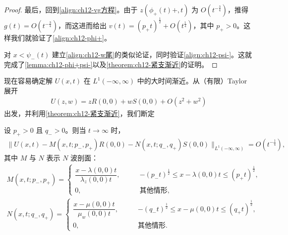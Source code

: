 \documentclass[../../main.tex]{subfiles}
\begin{document}
\begin{proof}
最后，回到\eqref{align:ch12-vg方程}。由于 $z(\phi_+(t)+,t)$ 为 $O(t^{-\frac34})$，推得 $g(t)=O(t^{-\frac34})$，而这进而给出 $v(t)=(p_+t)^{\frac12}+O(t^{\frac14})$，其中 $p_+>0$。这样我们就验证了\eqref{align:ch12-phi+}。

对 $x<\psi_-(t)$ 建立\eqref{align:ch12-w尾}的类似论证，同时验证\eqref{align:ch12-psi-}。这就完成了\cref{lemma:ch12-phi+psi-}以及\cref{theorem:ch12-紧支渐近}的证明。
\end{proof}

现在容易确定解 $U(x,t)$ 在 $L^1(-\infty,\infty)$ 中的大时间渐近。从（有限）Taylor 展开
\begin{align}
U(z,w)=zR(0,0)+wS(0,0)+O(z^2+w^2)
\label{align:ch12-U展开-s09}
\end{align}
出发，并利用\cref{theorem:ch12-紧支渐近}，我们断定

\begin{theorem}\label{theorem:ch12-N波}
设 $p_+>0$ 且 $q_->0$。则当 $t\to\infty$ 时，
\begin{align}
\|U(x,t)-M(x,t;p_-,p_+)R(0,0)-N(x,t;q_-,q_+)S(0,0)\|_{L^1(-\infty,\infty)}=O(t^{-\frac14}),
\label{align:ch12-N波}
\end{align}
其中 $M$ 与 $N$ 表示 $N$ 波剖面：
\begin{align}
M(x,t;p_-,p_+)=
\begin{cases}
\dfrac{x-\lambda(0,0)t}{\lambda_z(0,0)t},\qquad &-(p_-t)^{\frac12}\leqslant x-\lambda(0,0)t\leqslant(p_+t)^{\frac12},\\
0,\qquad &\text{其他情形},
\end{cases}
\label{align:ch12-M波}\\
N(x,t;q_-,q_+)=
\begin{cases}
\dfrac{x-\mu(0,0)t}{\mu_w(0,0)t},\qquad &-(q_-t)^{\frac12}\leqslant x-\mu(0,0)t\leqslant(q_+t)^{\frac12},\\
0,\qquad &\text{其他情形}.
\end{cases}
\label{align:ch12-N波形}
\end{align}
\end{theorem}
\end{document}
